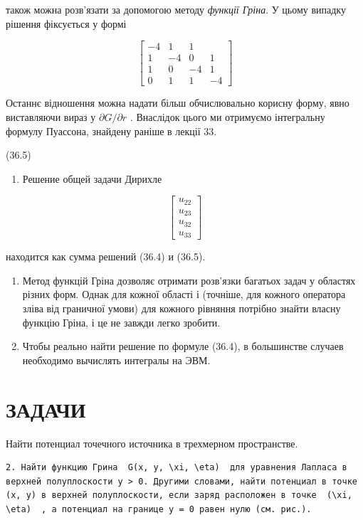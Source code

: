 \documentclass[
  ukrainian,
]{article}
\providecommand{\tightlist}{%
  \setlength{\itemsep}{0pt}\setlength{\parskip}{0pt}}
\begin{document}
також можна розв'язати за допомогою методу \emph{функції Гріна}. У цьому
випадку рішення фіксується у формі

\[
\begin{bmatrix} -4 & 1 & 1 \\ 1 & -4 & 0 & 1 \\ 1 & 0 & -4 & 1 \\ 0 & 1 & 1 & -4 \end{bmatrix}
\]

Останнє відношення можна надати більш обчислювально корисну форму, явно
виставляючи вираз у \(\partial G/\partial r\) . Внаслідок цього ми
отримуємо інтегральну формулу Пуассона, знайдену раніше в лекції 33.

(36.5)

\begin{enumerate}
\def\labelenumi{\arabic{enumi}.}
\setcounter{enumi}{1}
\tightlist
\item
  Решение общей задачи Дирихле
\end{enumerate}

\[
\begin{bmatrix} u_{22} \\ u_{23} \\ u_{32} \\ u_{33} \end{bmatrix}
\]

находится как сумма решений (36.4) и (36.5).

\begin{enumerate}
\def\labelenumi{\arabic{enumi}.}
\setcounter{enumi}{2}
\item
  Метод функцій Гріна дозволяє отримати розв'язки багатьох задач у
  областях різних форм. Однак для кожної області і (точніше, для кожного
  оператора зліва від граничної умови) для кожного рівняння потрібно
  знайти власну функцію Гріна, і це не завжди легко зробити.
\item
  Чтобы реально найти решение по формуле (36.4), в большинстве случаев
  необходимо вычислять интегралы на ЭВМ.
\end{enumerate}

\section{ЗАДАЧИ}\label{ux437ux430ux434ux430ux447ux438-5}

Найти потенциал точечного источника в трехмерном пространстве.

\begin{verbatim}
2. Найти функцию Грина  G(x, y, \xi, \eta)  для уравнения Лапласа в верхней полуплоскости y > 0. Другими словами, найти потенциал в точке (x, y) в верхней полуплоскости, если заряд расположен в точке  (\xi, \eta)  , а потенциал на границе y = 0 равен нулю (см. рис.).
\end{verbatim}
\end{document}
